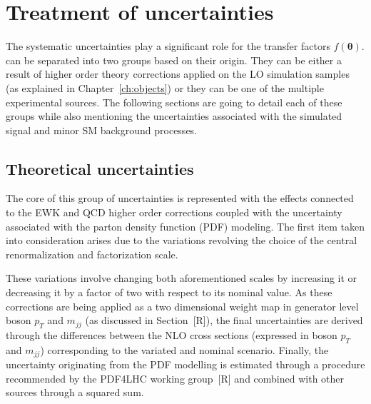 



\section{Treatment of uncertainties}
\hspace{10pt} The systematic uncertainties play a significant role for the transfer factors $f(\boldsymbol{\theta})$.  can be separated into two groups based on their origin. They can be either a result of higher order theory corrections applied on the LO simulation samples (as explained in Chapter~\ref{ch:objects}) or they can be one of the multiple experimental sources. The following sections are going to detail each of these groups while also mentioning the uncertainties associated with the simulated signal and minor SM background processes.
\subsection{Theoretical uncertainties}
\hspace{10pt} The core of this group of uncertainties is represented with the effects connected to the EWK and QCD higher order corrections coupled with the uncertainty associated with the parton density function (PDF) modeling. The first item taken into consideration arises due to the variations revolving the choice of the central renormalization and factorization scale.

\hspace{10pt} These variations involve changing both aforementioned scales by increasing it or decreasing it by a factor of two with respect to its nominal value. As these corrections are being applied as a two dimensional weight map in generator level boson $p_T$ and $m_{jj}$ (as discussed in Section~[R]), the final uncertainties are derived through the differences between the NLO cross sections (expressed in boson $p_T$ and $m_{jj}$) corresponding to the variated and nominal scenario. Finally, the uncertainty originating from the PDF modelling is estimated through a procedure recommended by the PDF4LHC working group~[R] and combined with other sources through a squared sum.

